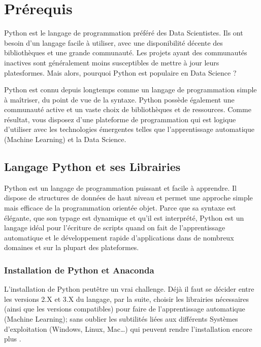 \documentclass[letterpaper,11pt,english]{sphinxmanual}
\begin{document}
\section{Pré\sphinxhyphen{}requis}
\label{\detokenize{chapter2:pre-requis}}\label{\detokenize{chapter2::doc}}
\sphinxAtStartPar
Python est le langage de programmation préféré des Data Scientistes. Ils
ont besoin d’un langage facile à utiliser, avec une disponibilité
décente des bibliothèques et une grande communauté. Les projets ayant
des communautés inactives sont généralement moins susceptibles de mettre
à jour leurs plates\sphinxhyphen{}formes. Mais alors, pourquoi Python est populaire en
Data Science ?

\sphinxAtStartPar
Python est connu depuis longtemps comme un langage de programmation
simple à maîtriser, du point de vue de la syntaxe. Python possède
également une communauté active et un vaste choix de bibliothèques et de
ressources. Comme résultat, vous disposez d’une plate\sphinxhyphen{}forme de
programmation qui est logique d’utiliser avec les technologies
émergentes telles que l’apprentissage automatique (Machine Learning) et
la Data Science.


\subsection{Langage Python et ses Librairies}
\label{\detokenize{chapter2:langage-python-et-ses-librairies}}
\sphinxAtStartPar
Python est un langage de programmation puissant et facile à apprendre.
Il dispose de structures de données de haut niveau et permet une
approche simple mais efficace de la programmation orientée objet. Parce
que sa syntaxe est élégante, que son typage est dynamique et qu’il est
interprété, Python est un langage idéal pour l’écriture de scripts quand
on fait de l’apprentissage automatique et le développement rapide
d’applications dans de nombreux domaines et sur la plupart des
plate\sphinxhyphen{}formes.


\subsubsection{Installation de Python et Anaconda}
\label{\detokenize{chapter2:installation-de-python-et-anaconda}}
\sphinxAtStartPar
L’installation de Python peut\sphinxhyphen{}être un vrai challenge. Déjà il faut se
décider entre les versions 2.X et 3.X du langage, par la suite, choisir
les librairies nécessaires (ainsi que les versions compatibles) pour
faire de l’apprentissage automatique (Machine Learning); sans oublier
les subtilités liées aux différents Systèmes d’exploitation (Windows,
Linux, Mac…) qui peuvent rendre l’installation encore plus
.
\end{document}
